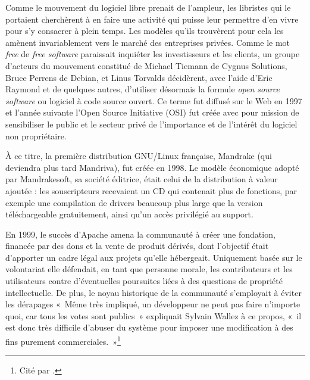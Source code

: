 \documentclass{FramateX}
\begin{document}
\begin{refsection}
Comme le mouvement du logiciel libre prenait de l'ampleur, les libristes
qui le portaient cherchèrent à en faire une activité qui puisse leur
permettre d'en vivre pour s'y consacrer à plein temps. Les modèles
qu'ils trouvèrent pour cela les amènent invariablement vers le marché
des entreprises privées. Comme le mot \textit{free} de \textit{free
software} paraissait inquiéter les investisseurs et les clients, un
groupe d'acteurs du mouvement constitué de Michael Tiemann de Cygnus
Solutions, Bruce Perrens de Debian, et Linus Torvalds décidèrent, avec
l'aide d'Eric Raymond et de quelques autres, d'utiliser désormais la
formule \textit{open source software} ou logiciel à code source ouvert.
Ce terme fut diffusé sur le Web en 1997 et l'année suivante l'Open
Source Initiative (OSI) fut créée avec pour mission de sensibiliser le
public et le secteur privé de l'importance et de l'intérêt du logiciel
non propriétaire.

À ce titre, la première distribution GNU/Linux française, Mandrake (qui
deviendra plus tard Mandriva), fut créée en 1998. Le modèle économique
adopté par Mandrakesoft, sa société éditrice, était celui de la
distribution à valeur ajoutée : les souscripteurs recevaient un CD qui
contenait plus de fonctions, par exemple une compilation de drivers
beaucoup plus large que la version téléchargeable gratuitement, ainsi
qu'un accès privilégié au support.

En 1999, le succès d'Apache amena la communauté à créer une fondation,
financée par des dons et la vente de produit dérivés, dont l'objectif
était d'apporter un cadre légal aux projets qu'elle
hébergeait. Uniquement basée sur le volontariat elle défendait, en tant
que personne morale, les contributeurs et les utilisateurs contre
d'éventuelles poursuites liées à des questions de
propriété intellectuelle. De plus, le noyau historique de la communauté
s'employait à éviter les dérapages «~Même très impliqué, un
développeur ne peut pas faire n'importe quoi, car tous
les votes sont publics~» expliquait Sylvain Wallez à ce propos,
«~il est donc très difficile d'abuser du
système pour imposer une modification à des fins purement
commerciales.~»\footnote{Cité par \cite{Bordage2005}.}


\end{refsection}
\end{document}
